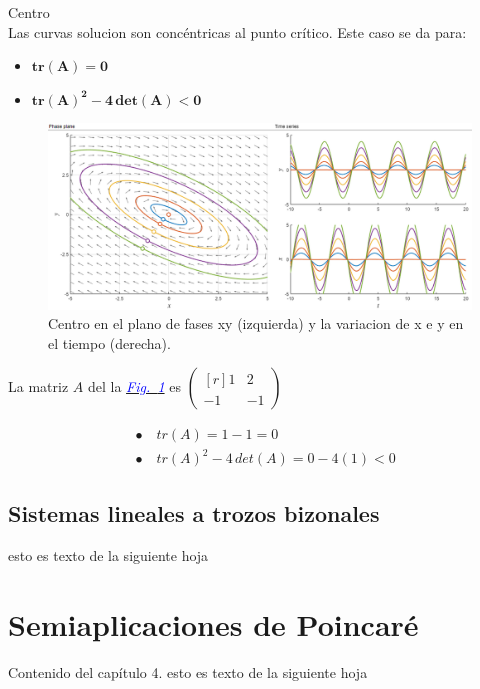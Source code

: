 \documentclass[12pt,a4paper]{report} %
\newcommand{\fref}[1]{\hyperref[#1]{\textcolor{blue}{\textit{Fig.~\ref*{#1}}}}}
\begin{document}
	\newpage
	
    {\Large\textbullet\quad Centro}\\[0.5cm]
    
    Las curvas solucion son concéntricas al punto crítico. Este caso se da para: 
    \begin{itemize}
    	\item $\bm{tr(A)=0}$
    	\item $\bm{tr(A)^2-4\,det(A)<0}$
    \end{itemize}
    
    \begin{figure}[h]
    	\centering
    	\includegraphics[width=1\textwidth]{centro.png}
    	\caption{Centro en el plano de fases xy (izquierda) y la variacion de x e y en el tiempo (derecha).}
    	\label{fig:centro}
    \end{figure}\smallskip
    
    La matriz $A$ del la \fref{fig:centro} es 
    $\begin{pmatrix*}[r]
    	1 & 2 \\
    	-1 & -1
    \end{pmatrix*}$
    
    \begin{align*}
    	&\bullet\quad tr(A)=1-1=0 \\[2mm]
    	&\bullet\quad tr(A)^2-4\,det(A)=0-4(1)<0
    \end{align*}
	
	\newpage
	\section{Sistemas lineales a trozos bizonales}
	esto es texto de la siguiente hoja
	
	\chapter{Semiaplicaciones de Poincaré}
	Contenido del capítulo 4.
	\newpage
	esto es texto de la siguiente hoja
	
\end{document}
